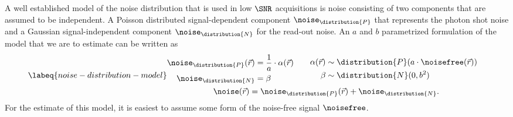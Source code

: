 A well established model of the noise distribution that is used in low \(\SNR\) acquisitions is noise consisting of two
    components that are assumed to be independent.
A Poisson distributed signal-dependent component \(\noise_{\distribution{P}}\) that represents the photon shot noise and 
    a Gaussian signal-independent component \(\noise_{\distribution{N}}\) for the read-out noise.
An \(a\) and \(b\) parametrized formulation of the model that we are to estimate can be written as
\begin{equation}
    \labeq{noise-distribution-model}
    \begin{gathered}
        \begin{aligned}
            \begin{aligned}
                \noise_{\distribution{P}}(\vec{r}) &= \frac{1}{a}\cdot \alpha(\vec{r}) \\
                \noise_{\distribution{N}} &= \beta 
            \end{aligned} \quad&\quad
            \begin{aligned}
                \alpha(\vec{r}) &\sim \distribution{P}(a \cdot \noisefree(\vec{r}))\\ 
                \beta &\sim \distribution{N}(0, b^2)
            \end{aligned}
        \end{aligned}\\
        \noise(\vec{r}) = \noise_{\distribution{P}}(\vec{r}) + \noise_{\distribution{N}}.
    \end{gathered}
\end{equation}
For the estimate of this model, it is easiest to assume some form of the noise-free signal \(\noisefree\).

